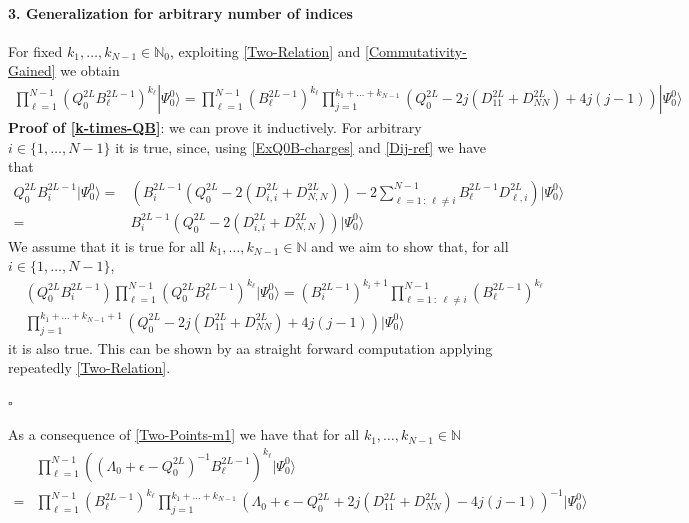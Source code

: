 \documentclass[10pt]{article}
\numberwithin{equation}{section}
\numberwithin{equation}{subsection}
\begin{document}
\paragraph{3. Generalization for arbitrary number of indices} For fixed $k_{1},\ldots,k_{N-1}\in \mathbb{N}_{0}$, exploiting \eqref{Two-Relation} and \eqref{Commutativity-Gained} we obtain 
\begin{equation}\label{k-times-QB}
	\begin{split}
		\prod_{\ell=1}^{N-1}\left(Q_{0}^{2L}B_{\ell}^{2L-1}\right)^{k_{\ell}}|\Psi_{0}^{0}\rangle=\prod_{\ell=1}^{N-1}\left(B_{\ell}^{2L-1}\right)^{k_{\ell}}\prod_{j=1}^{k_{1}+\ldots+k_{N-1}}\left(Q_{0}^{2L}-2j(D_{11}^{2L}+D_{NN}^{2L})+4j(j-1)\right)|\Psi_{0}^{0}\rangle
	\end{split}
\end{equation}
\textbf{Proof of \eqref{k-times-QB}}: we can prove it inductively. For arbitrary $i\in\{1,\ldots,N-1\}$ it is true, since, using \eqref{ExQ0B-charges} and \eqref{Dij-ref} we have that 
\begin{align}
	Q_{0}^{2L}B_{i}^{2L-1}|\Psi_{0}^{0}\rangle=&\left(B_{i}^{2L-1}\left(Q_{0}^{2L}-2(D_{i,i}^{2L}+D_{N,N}^{2L})\right)-2\sum_{\ell=1\,:\,\ell\neq i}^{N-1}B_{\ell}^{2L-1}D_{\ell,i}^{2L}\right)|\Psi_{0}^{0}\rangle\nonumber\\=&B_{i}^{2L-1}\left(Q_{0}^{2L}-2(D_{i,i}^{2L}+D_{N,N}^{2L})\right)|\Psi_{0}^{0}\rangle
\end{align}
We assume that it is true for all $k_{1},\ldots,k_{N-1}\in\mathbb{N}$ and we aim to show that, for all $i\in\{1,\ldots,N-1\}$,  
\begin{align}
&\left(Q_{0}^{2L}B_{i}^{2L-1}\right)\prod_{\ell=1}^{N-1}\left(Q_{0}^{2L}B_{\ell}^{2L-1}\right)^{k_{\ell}}|\Psi_{0}^{0}\rangle=\left(B_{i}^{2L-1}\right)^{k_{i}+1}\prod_{\ell=1\,:\;\ell\neq i}^{N-1}\left(B_{\ell}^{2L-1}\right)^{k_{\ell}}\nonumber\\&\prod_{j=1}^{k_{1}+\ldots+k_{N-1}+1}\left(Q_{0}^{2L}-2j(D_{11}^{2L}+D_{NN}^{2L})+4j(j-1)\right)|\Psi_{0}^{0}\rangle
\end{align}
it is also true. This can be shown by aa straight forward computation applying repeatedly \eqref{Two-Relation}.
\begin{flushright}
	$\square$
\end{flushright}
As a consequence of \eqref{Two-Points-m1} we have that for all  $k_{1},\ldots,k_{N-1}\in\mathbb{N}$
\begin{equation}\label{k-times-LQB}
	\begin{split}
		&\prod_{\ell=1}^{N-1}\left((\Lambda_{0}+\epsilon-Q_{0}^{2L})^{-1}B_{\ell}^{2L-1}\right)^{k_{\ell}}|\Psi_{0}^{0}\rangle\\=&\prod_{\ell=1}^{N-1}\left(B_{\ell}^{2L-1}\right)^{k_{\ell}}\prod_{j=1}^{k_{1}+\ldots+k_{N-1}}\left(\Lambda_{0}+\epsilon-Q_{0}^{2L}+2j(D_{11}^{2L}+D_{NN}^{2L})-4j(j-1)\right)^{-1}|\Psi_{0}^{0}\rangle
	\end{split}
\end{equation}
\end{document}
